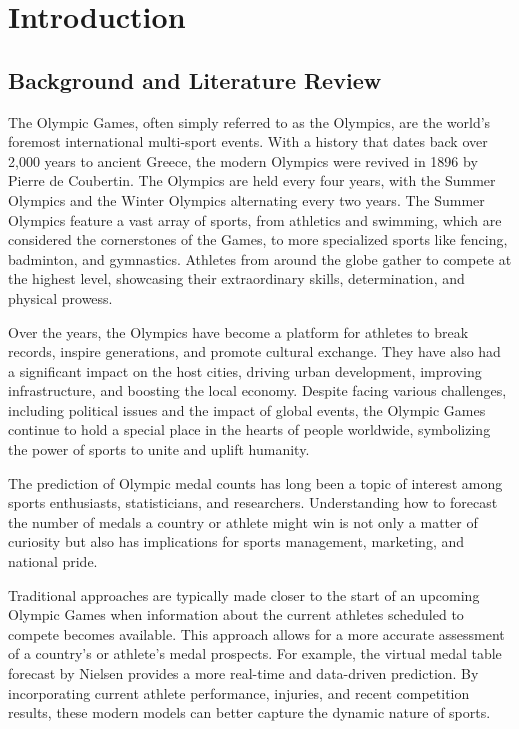 \section{Introduction}

\subsection{Background and Literature Review}

The Olympic Games, often simply referred to as the Olympics, are the world's foremost international multi-sport events. With a history that dates back over 2,000 years to ancient Greece, the modern Olympics were revived in 1896 by Pierre de Coubertin.
The Olympics are held every four years, with the Summer Olympics and the Winter Olympics alternating every two years. The Summer Olympics feature a vast array of sports, from athletics and swimming, which are considered the cornerstones of the Games, to more specialized sports like fencing, badminton, and gymnastics. Athletes from around the globe gather to compete at the highest level, showcasing their extraordinary skills, determination, and physical prowess.

Over the years, the Olympics have become a platform for athletes to break records, inspire generations, and promote cultural exchange. They have also had a significant impact on the host cities, driving urban development, improving infrastructure, and boosting the local economy. Despite facing various challenges, including political issues and the impact of global events, the Olympic Games continue to hold a special place in the hearts of people worldwide, symbolizing the power of sports to unite and uplift humanity.

The prediction of Olympic medal counts has long been a topic of interest among sports enthusiasts, statisticians, and researchers. Understanding how to forecast the number of medals a country or athlete might win is not only a matter of curiosity but also has implications for sports management, marketing, and national pride. 

Traditional approaches are typically made closer to the start of an upcoming Olympic Games when information about the current athletes scheduled to compete becomes available. This approach allows for a more accurate assessment of a country's or athlete's medal prospects. For example, the virtual medal table forecast by Nielsen \cite{1} provides a more real-time and data-driven prediction. By incorporating current athlete performance, injuries, and recent competition results, these modern models can better capture the dynamic nature of sports.

